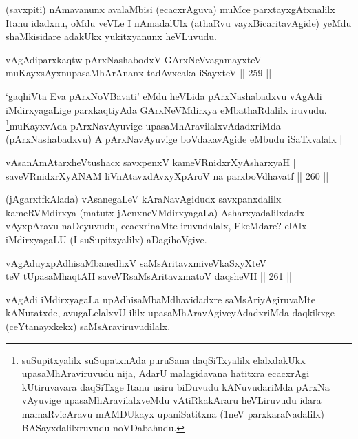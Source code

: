 \begin{artha}
(savxpiti) nAmavanunx avalaMbisi (ecacxrAguva) muMce parxtayxgAtxnalilx Itanu idadxnu, oMdu veVLe I nAmadalUlx (athaRvu vayxBicaritavAgide) yeMdu shaMkisidare adakUkx yukitxyanunx heVLuvudu.
\end{artha}


\begin{shl}
vAgAdiparxkaqtw pArxNashabodxV GArxNeV\s vagamayxteV |\\
muKayxsAyxnupasaMhArAnanx tadAvxcaka iSayxteV \hfill || 259 ||
\end{shl}

\begin{artha}
`gaqhiVta Eva pArxNoVBavati' eMdu heVLida pArxNashabadxvu vAgAdi 
iMdirxyagaLige parxkaqtiyAda GArxNeVMdirxya eMbathaRdalilx iruvudu. 
\footnote{suSupitxyalilx suSupatxnAda puruSana daqSiTxyalilx 
elalxdakUkx upasaMhAraviruvudu nija, AdarU malagidavana hatitxra ecacxrAgi kUtiruvavara daqSiTxge Itanu usiru biDuvudu kANuvudariMda pArxNa vAyuvige upasaMhAravilalxveMdu vAtiRkakAraru heVLiruvudu idara mamaRvicAravu mAMDUkayx upaniSatitxna (1neV parxkaraNadalilx) BASayxdalilxruvudu noVDabahudu.}muKayxvAda pArxNavAyuvige upasaMhAravilalxvAdadxriMda (pArxNashabadxvu) A pArxNavAyuvige boVdakavAgide eMbudu iSaTxvalalx |
\end{artha}

\begin{shl}
vAsanAmAtarxheVtushacx savxpenxV kameVRnidxrXyAsharxyaH |\\
saveVRnidxrXyANAM liVnAtavxdAvxyXpAroV na parxboVdhavatf \hfill || 260 ||
\end{shl}

\begin{artha}
(jAgarxtfkAlada) vAsanegaLeV kAraNavAgidudx savxpanxdalilx  kameRVMdirxya (matutx jAcnxneVMdirxyagaLa) Asharxyadalilxdadx vAyxpAravu naDeyuvudu, ecacxrinaMte iruvudalalx, EkeMdare? elAlx iMdirxyagaLU (I suSupitxyalilx) aDagihoVgive.
\end{artha}

\begin{shl}
vAgAduyxpAdhisaMbanedhxV saMsAritavxmiveVkaSxyXteV |\\
teV tUpasaMhaqtAH saveVR\s saMsAritavxmatoV daqsheVH \hfill || 261 ||
\end{shl}

\begin{artha}
vAgAdi iMdirxyagaLa upAdhisaMbaMdhavidadxre saMsAriyAgiruvaMte kANutatxde, avugaLelalxvU ililx upasaMhAravAgiveyAdadxriMda daqkikxge (ceYtanayxkekx) saMsAraviruvudilalx.
\end{artha}

